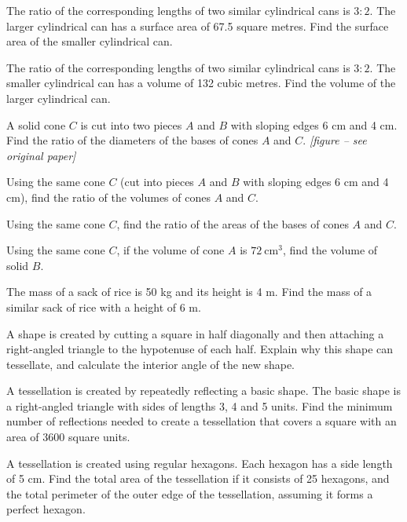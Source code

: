 \documentclass[11pt]{article}
\begin{document}
\begin{wq}[start=287]
\item The ratio of the corresponding lengths of two similar cylindrical cans is $3:2$. The larger cylindrical can has a surface area of 67.5 square metres. Find the surface area of the smaller cylindrical can.

\item The ratio of the corresponding lengths of two similar cylindrical cans is $3:2$. The smaller cylindrical can has a volume of 132 cubic metres. Find the volume of the larger cylindrical can.

\item A solid cone $C$ is cut into two pieces $A$ and $B$ with sloping edges 6 cm and 4 cm. Find the ratio of the diameters of the bases of cones $A$ and $C$. \emph{[figure -- see original paper]}

\item Using the same cone $C$ (cut into pieces $A$ and $B$ with sloping edges 6 cm and 4 cm), find the ratio of the volumes of cones $A$ and $C$.

\item Using the same cone $C$, find the ratio of the areas of the bases of cones $A$ and $C$.

\item Using the same cone $C$, if the volume of cone $A$ is $72\ \text{cm}^3$, find the volume of solid $B$.

\item The mass of a sack of rice is 50 kg and its height is 4 m. Find the mass of a similar sack of rice with a height of 6 m.

\item A shape is created by cutting a square in half diagonally and then attaching a right-angled triangle to the hypotenuse of each half. Explain why this shape can tessellate, and calculate the interior angle of the new shape.

\item A tessellation is created by repeatedly reflecting a basic shape. The basic shape is a right-angled triangle with sides of lengths 3, 4 and 5 units. Find the minimum number of reflections needed to create a tessellation that covers a square with an area of 3600 square units.

\item A tessellation is created using regular hexagons. Each hexagon has a side length of 5 cm. Find the total area of the tessellation if it consists of 25 hexagons, and the total perimeter of the outer edge of the tessellation, assuming it forms a perfect hexagon.


\end{wq}
\end{document}
